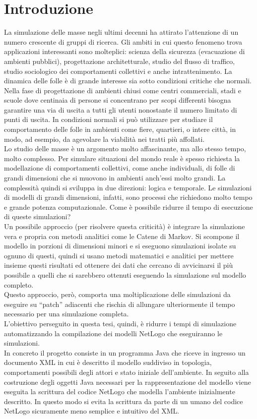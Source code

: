 \chapter{Introduzione}
La simulazione delle masse negli ultimi decenni ha attirato l'attenzione di un numero crescente di gruppi di ricerca. Gli ambiti in cui questo fenomeno trova applicazioni interessanti sono molteplici: scienza della sicurezza (evacuazione di ambienti pubblici), progettazione architetturale, studio del flusso di traffico, studio sociologico dei comportamenti collettivi e anche intrattenimento. La dinamica delle folle è di grande interesse sia sotto condizioni critiche che normali. Nella fase di progettazione di ambienti chiusi come centri commerciali, stadi e scuole dove centinaia di persone si concentrano per scopi differenti bisogna garantire una via di uscita a tutti gli utenti nonostante il numero limitato di punti di uscita. In condizioni normali si può utilizzare per studiare il comportamento delle folle in ambienti come fiere, quartieri, o intere città, in modo, ad esempio, da agevolare la viabilità nei tratti più affollati.\\
Lo studio delle masse è un argomento molto affascinante, ma allo stesso tempo, molto complesso. Per simulare situazioni del mondo reale è spesso richiesta la modellazione di comportamenti collettivi, come anche individuali, di folle di grandi dimensioni che si muovono in ambienti anch'essi molto grandi. La complessità quindi si sviluppa in due direzioni: logica e temporale. Le simulazioni di modelli di grandi dimensioni, infatti, sono processi che richiedono molto tempo e grande potenza computazionale. Come è possibile ridurre il tempo di esecuzione di queste simulazioni? \\
Un possibile approccio (per risolvere questa criticità) è integrare la simulazione vera e propria con metodi analitici come le Catene di Markov. Si scompone il modello in porzioni di dimensioni minori e si eseguono simulazioni isolate su ognuno di questi, quindi si usano metodi matematici e analitici per mettere insieme questi risultati ed ottenere dei dati che cercano di avvicinarsi il più possibile a quelli che si sarebbero ottenuti eseguendo la simulazione sul modello completo.\\
Questo approccio, però, comporta una moltiplicazione delle simulazioni da eseguire su “patch” adiacenti che rischia di allungare ulteriormente il tempo necessario per una simulazione completa.\\
L'obiettivo perseguito in questa tesi, quindi, è ridurre i tempi di simulazione automatizzando la compilazione dei modelli NetLogo che eseguiranno le simulazioni.\\
In concreto il progetto consiste in un programma Java che riceve in ingresso un documento XML in cui è descritto il modello suddiviso in topologia, comportamenti possibili degli attori e stato iniziale dell'ambiente. In seguito alla costruzione degli oggetti Java necessari per la rappresentazione del modello viene eseguita la scrittura del codice NetLogo che modella l'ambiente inizialmente descritto. In questo modo si evita la scrittura da parte di un umano del codice NetLogo sicuramente meno semplice e intuitivo del XML.
 